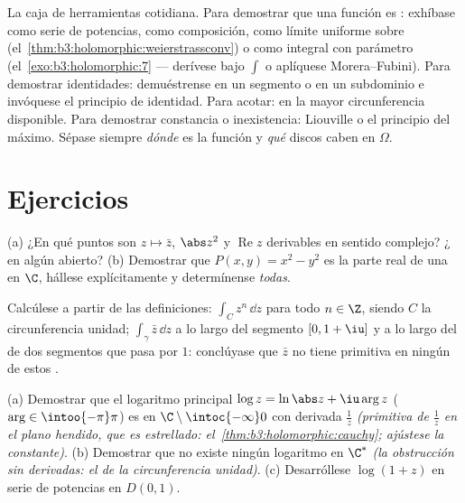 \begin{method}\label{met:b3:holomorphic:toolkit}
La caja de herramientas cotidiana. Para demostrar que una función es
: exhíbase como serie de
potencias, como composición, como límite uniforme sobre 
(el~\cref{thm:b3:holomorphic:weierstrassconv}) o como integral con
parámetro 
(el~\cref{exo:b3:holomorphic:7} --- derívese bajo $\int$ o aplíquese
Morera--Fubini). Para demostrar identidades: demuéstrense en un segmento
o en un subdominio e invóquese el principio de identidad. Para acotar:
 en la mayor
circunferencia disponible. Para demostrar constancia o inexistencia:
Liouville o el principio del máximo. Sépase siempre \emph{dónde} es
 la función y \emph{qué}
discos caben en
$\Omega$.
\end{method}

\section{Ejercicios}

\begin{exercise}[$\star$]\label{exo:b3:holomorphic:1}
(a) ¿En qué puntos son $z \mapsto \bar z$, $\abs z^2$ y
$\operatorname{Re}z$ derivables en sentido complejo?
¿ en algún
abierto? (b) Demostrar que
$P(x, y) = x^2 - y^2$ es la parte real de una
 en $\C$, hállese
explícitamente y determínense \emph{todas}.
\end{exercise}

\begin{exercise}[$\star$]\label{exo:b3:holomorphic:2}
Calcúlese a partir de las definiciones: $\int_{C}z^n\,\dd z$ para todo
$n
\in \Z$, siendo $C$ la circunferencia unidad; $\int_\gamma\bar z\,\dd z$
a lo largo del segmento $[0, 1+\iu]$ y a lo largo del
 de dos segmentos que pasa
por $1$: conclúyase que $\bar z$ no tiene primitiva en ningún
 de estos
.
\end{exercise}

\begin{exercise}[$\star\star$]\label{exo:b3:holomorphic:3}
(a) Demostrar que el logaritmo principal $\log z = \ln\abs z +
\iu\arg z$ ($\arg \in \intoo{-\pi}\pi$) es
 en
$\C\setminus\intoc{-\infty}0$ con derivada $\frac1z$ \emph{(primitiva de
$\frac1z$ en el plano hendido, que es estrellado:
el~\cref{thm:b3:holomorphic:cauchy}; ajústese la constante)}. (b)
Demostrar que no existe ningún logaritmo
 en $\C^*$ \emph{(la
obstrucción sin derivadas: el 
de la circunferencia unidad)}. (c) Desarróllese $\log(1 + z)$ en serie
de potencias en $D(0,1)$.
\end{exercise}

